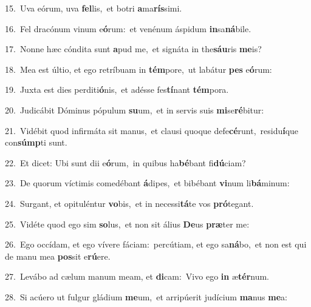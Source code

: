 {\numbfont\textcolor{\numbcolor}{15.}}~Uva eórum, uva \textbf{fel}\-lis,~\star et botri \textbf{a}\-ma\-\textbf{rís}\-simi.\par
{\numbfont\textcolor{\numbcolor}{16.}}~Fel dracónum vinum e\-\textbf{ó}\-rum:~\star et venénum áspidum \textbf{in}\-sa\-\textbf{ná}\-bile.\par
{\numbfont\textcolor{\numbcolor}{17.}}~Nonne hæc cóndita sunt \textbf{a}\-pud me,~\star et signáta in the\-\textbf{sáu}\-ris \textbf{me}\-is?\par
{\numbfont\textcolor{\numbcolor}{18.}}~Mea est últio, et ego retríbuam in \textbf{tém}\-pore,~\star ut labátur \textbf{pes} e\-\textbf{ó}\-rum:\par
{\numbfont\textcolor{\numbcolor}{19.}}~Juxta est dies perditi\-\textbf{ó}\-nis,~\star et adésse fes\-\textbf{tí}\-nant \textbf{tém}\-pora.\par
{\numbfont\textcolor{\numbcolor}{20.}}~Judicábit Dóminus pópulum \textbf{su}\-um,~\star et in servis suis \textbf{mi}\-se\-\textbf{ré}\-bitur:\par
{\numbfont\textcolor{\numbcolor}{21.}}~Vidébit quod infirmáta sit manus,~\dagger et clausi quoque defe\-\textbf{cé}\-runt,~\star residu\-\textbf{í}\-que con\-\textbf{súmp}\-ti sunt.\par
{\numbfont\textcolor{\numbcolor}{22.}}~Et dicet: Ubi sunt dii e\-\textbf{ó}\-rum,~\star in quibus ha\-\textbf{bé}\-bant fi\-\textbf{dú}\-ciam?\par
{\numbfont\textcolor{\numbcolor}{23.}}~De quorum víctimis comedébant \textbf{á}\-dipes,~\star et bibébant \textbf{vi}\-num li\-\textbf{bá}\-minum:\par
{\numbfont\textcolor{\numbcolor}{24.}}~Surgant, et opituléntur \textbf{vo}\-bis,~\star et in necessi\-\textbf{tá}\-te vos \textbf{pró}\-tegant.\par
{\numbfont\textcolor{\numbcolor}{25.}}~Vidéte quod ego sim \textbf{so}\-lus,~\star et non sit álius \textbf{De}\-us \textbf{præ}\-ter me:\par
{\numbfont\textcolor{\numbcolor}{26.}}~Ego occídam, et ego vívere fáciam:~\dagger percútiam, et ego sa\-\textbf{ná}\-bo,~\star et non est qui de manu mea \textbf{pos}\-sit e\-\textbf{rú}\-ere.\par
{\numbfont\textcolor{\numbcolor}{27.}}~Levábo ad cælum manum meam, et \textbf{di}\-cam:~\star Vivo ego \textbf{in} æ\-\textbf{tér}\-num.\par
{\numbfont\textcolor{\numbcolor}{28.}}~Si acúero ut fulgur gládium \textbf{me}\-um,~\star et arripúerit judícium \textbf{ma}\-nus \textbf{me}\-a:\par
